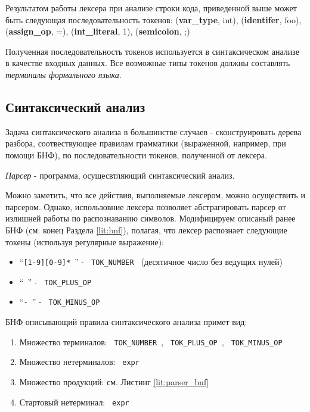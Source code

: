 Результатом работы лексера при анализе строки кода, приведенной выше может быть следующая последовательность токенов: (\textbf{var\_type}, int), (\textbf{identifer}, foo), (\textbf{assign\_op}, =), (\textbf{int\_literal}, 1), (\textbf{semicolon}, ;)

Полученная последовательность токенов используется в синтаксическом анализе в качестве входных данных. Все возможные типы токенов должны составлять \textit{терминалы формального языка}.

\subsection{Синтаксический анализ}
Задача синтаксического анализа в большинстве случаев - сконструировать дерева разбора, соотвествующее правилам грамматики (выраженной, например, при помощи БНФ), по последовательности токенов, полученной от лексера.

\textit{Парсер} - программа, осущесвтляющий синтаксический анализ. 

Можно заметить, что все действия, выполняемые лексером, можно осуществить и парсером. Однако,  использовние лексера позволяет абстрагировать парсер от излишней работы по распознаванию символов. Модифицируем описаный ранее БНФ (см. конец Раздела \ref{lit:bnf}), полагая, что лексер распознает следующие токены (используя регулярные выражение):
\begin{itemize}
    \item \enquote{\texttt{[1-9][0-9]* }} - \texttt{ TOK_NUMBER } (десятичное число без ведущих нулей)
    \item \enquote{\texttt{\+ }} - \texttt{ TOK_PLUS_OP }
    \item \enquote{\texttt{- }} - \texttt{ TOK_MINUS_OP }
\end{itemize}

БНФ описывающий правила синтаксического анализа примет вид:
\begin{enumerate}
    \item Множество терминалов: \texttt{ TOK_NUMBER }, \texttt{ TOK_PLUS_OP }, \texttt{ TOK_MINUS_OP }
    \item Множество нетерминалов: \texttt{ expr }
    \item Множество продукций: см. Листинг \ref{lit:parser_bnf}
    \item Стартовый нетерминал: \texttt{ expr }
\end{enumerate}

